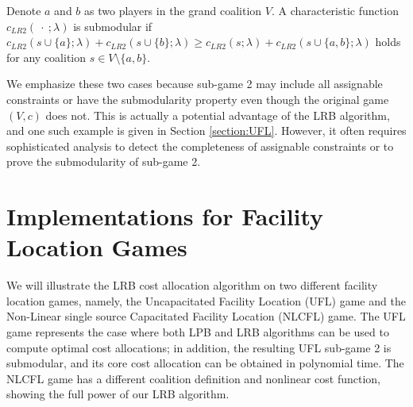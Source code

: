 \documentclass[ijoc,nonblindrev]{informs3} %
\begin{document}
\begin{definition}
Denote $a$ and $b$ as two players in the grand coalition $V$. A characteristic function $c_{LR2}(\ \cdot\ ;\lambda)$ is submodular if $c_{LR2}(s \cup \{a\};\lambda) + c_{LR2}(s \cup \{b\};\lambda) \geq c_{LR2}(s;\lambda) + c_{LR2}(s \cup \{a,b\};\lambda)$ holds for any coalition $s \in V \setminus \{a,b\}$.
\end{definition}

We emphasize these two cases because sub-game 2 may include all assignable constraints or have the submodularity property even though the original game $(V,c)$ does not. This is actually a potential advantage of the LRB algorithm, and one such example is given in Section \ref{section:UFL}.
However, it often requires sophisticated analysis to detect the completeness of assignable constraints or to prove the submodularity of sub-game 2.








\section{Implementations for Facility Location Games}\label{section:implementation}
We will illustrate the LRB cost allocation algorithm on two different facility location games, namely, the Uncapacitated Facility Location (UFL) game and the Non-Linear single source Capacitated Facility Location (NLCFL) game. 
The UFL game represents the case where both LPB and LRB algorithms can be used to compute optimal cost allocations; in addition, the resulting UFL sub-game 2 is submodular, and its core cost allocation can be obtained in polynomial time.
The NLCFL game has a different coalition definition and nonlinear cost function, showing the full power of our LRB algorithm.
\end{document}
